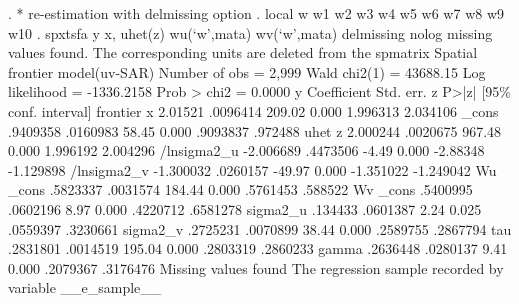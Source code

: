. * re-estimation with delmissing option 
. local w w1 w2 w3 w4 w5 w6 w7 w8 w9 w10
{\smallskip}
. spxtsfa y x, uhet(z) wu(`w',mata) wv(`w',mata) delmissing nolog
missing values found. The corresponding units are deleted from the spmatrix
{\smallskip}
{\smallskip}
Spatial frontier model(uv-SAR)                        Number of obs =    2,999
                                                      Wald chi2(1)  = 43688.15
Log likelihood = -1336.2158                           Prob > chi2   =   0.0000
{\smallskip}
           y {\VBAR} Coefficient  Std. err.      z    P>|z|     [95\% conf. interval]
frontier     {\VBAR}
           x {\VBAR}    2.01521   .0096414   209.02   0.000     1.996313    2.034106
       _cons {\VBAR}   .9409358   .0160983    58.45   0.000     .9093837     .972488
uhet         {\VBAR}
           z {\VBAR}   2.000244   .0020675   967.48   0.000     1.996192    2.004296
 /lnsigma2_u {\VBAR}  -2.006689   .4473506    -4.49   0.000     -2.88348   -1.129898
 /lnsigma2_v {\VBAR}  -1.300032   .0260157   -49.97   0.000    -1.351022   -1.249042
Wu           {\VBAR}
       _cons {\VBAR}   .5823337   .0031574   184.44   0.000     .5761453     .588522
Wv           {\VBAR}
       _cons {\VBAR}   .5400995   .0602196     8.97   0.000     .4220712    .6581278
    sigma2_u {\VBAR}    .134433   .0601387     2.24   0.025     .0559397    .3230661
    sigma2_v {\VBAR}   .2725231   .0070899    38.44   0.000     .2589755    .2867794
         tau {\VBAR}   .2831801   .0014519   195.04   0.000     .2803319    .2860233
       gamma {\VBAR}   .2636448   .0280137     9.41   0.000     .2079367    .3176476
Missing values found
The regression sample recorded by variable __e_sample__
